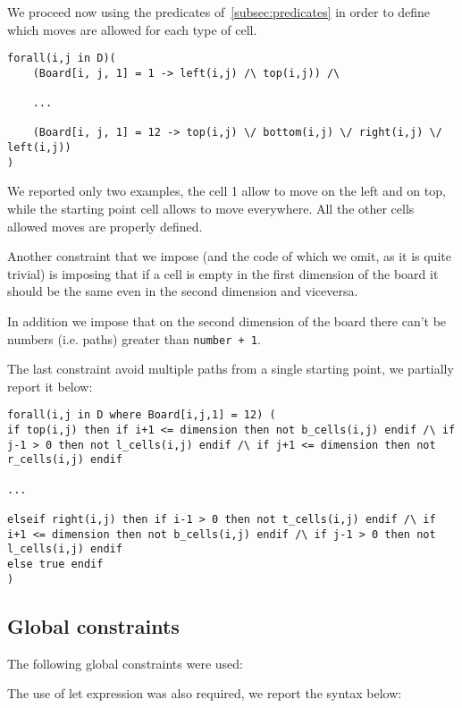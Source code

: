 We proceed now using the predicates of~\ref{subsec:predicates} in order to define which moves are allowed for each type of cell.


\begin{verbatim}
forall(i,j in D)(
    (Board[i, j, 1] = 1 -> left(i,j) /\ top(i,j)) /\

    ...

    (Board[i, j, 1] = 12 -> top(i,j) \/ bottom(i,j) \/ right(i,j) \/ left(i,j))
)
\end{verbatim}

We reported only two examples, the cell 1 allow to move on the left and on top, while the starting point cell allows to move everywhere. All the other cells allowed moves are properly defined.

Another constraint that we impose (and the code of which we omit, as it is quite trivial) is imposing that if a cell is empty in the first dimension of the board it should be the same even in the second dimension and viceversa.

In addition we impose that on the second dimension of the board there can't be numbers (i.e. paths) greater than \texttt{number + 1}.

The last constraint avoid multiple paths from a single starting point, we partially report it below:

\begin{verbatim}
forall(i,j in D where Board[i,j,1] = 12) (
if top(i,j) then if i+1 <= dimension then not b_cells(i,j) endif /\ if j-1 > 0 then not l_cells(i,j) endif /\ if j+1 <= dimension then not r_cells(i,j) endif

...

elseif right(i,j) then if i-1 > 0 then not t_cells(i,j) endif /\ if i+1 <= dimension then not b_cells(i,j) endif /\ if j-1 > 0 then not l_cells(i,j) endif
else true endif
)
\end{verbatim}


\subsection{Global constraints}
The following global constraints were used:

The use of let expression was also required, we report the syntax below:

